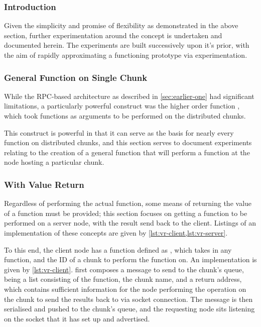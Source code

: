 \subsubsection{Introduction}

Given the simplicity and promise of flexibility as demonstrated in the
above section,
further experimentation around the concept is undertaken and documented herein.
The experiments are built successively upon it's prior, with the aim of rapidly
approximating a functioning prototype via experimentation.

\subsubsection{General Function on Single Chunk}

While the RPC-based architecture as described in \cref{sec:earlier-one}
had significant limitations, a particularly powerful construct was the higher
order function , which took functions as arguments
to be performed on the distributed chunks.

This construct is powerful in that it can serve as the basis for nearly every
function on distributed chunks, and this section serves to document experiments
relating to the creation of a general function that will perform a function at
the node hosting a particular chunk.

\subsubsection{With Value Return}\label{sec:val-ret}

Regardless of performing the actual function, some means of returning the value
of a function must be provided; this section focuses on getting a function to
be performed on a server node, with the result send back to the client.
Listings of an implementation of these concepts are given by \cref{lst:vr-client,lst:vr-server}.



To this end, the client node has a function defined as , which takes in any function, and the ID of a chunk to perform the
function on.
An implementation is given by \cref{lst:vr-client}.
 first composes a message to send to the chunk's queue, being a
list consisting of the function, the chunk name, and a return address, which
contains sufficient information for the node performing the operation on the
chunk to send the results back to via socket connection.
The message is then serialised and pushed to the chunk's queue, and the
requesting node sits listening on the socket that it has set up and advertised.

